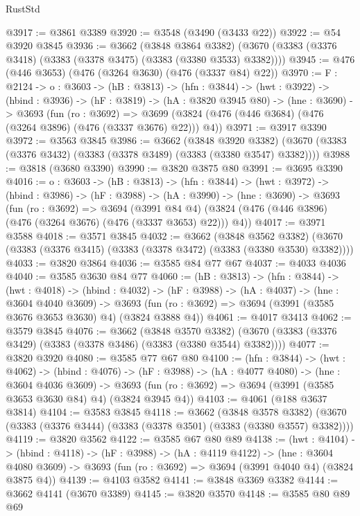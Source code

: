 \begin{lexlean}{RustStd}
\begin{coremodule}
@3917 := @3861 @3389
@3920 := @3548 (@3490 (@3433 @22))
@3922 := @54 @3920 @3845
@3936 := @3662
    (@3848 @3864 @3382)
    (@3670 (@3383 (@3376 @3418) (@3383 (@3378 @3475) (@3383 (@3380 @3533) @3382))))
@3945 := @476 (@446 @3653) (@476 (@3264 @3630) (@476 (@3337 @84) @22))
@3970 := {F : @2124} ->
  {o : @3603} ->
  (hB : @3813) ->
  (hfn : @3844) ->
  (hwt : @3922) ->
  (hbind : @3936) ->
  (hF : @3819) ->
  (hA : @3820 @3945 @80) ->
  (hne : @3690) ->
  @3693
    (fun (ro : @3692) =>
    @3699 (@3824 (@476 (@446 @3684) (@476 (@3264 @3896) (@476 (@3337 @3676) @22))) @4))
@3971 := @3917 @3390
@3972 := @3563 @3845
@3986 := @3662
    (@3848 @3920 @3382)
    (@3670 (@3383 (@3376 @3432) (@3383 (@3378 @3489) (@3383 (@3380 @3547) @3382))))
@3988 := @3818 (@3680 @3390)
@3990 := @3820 @3875 @80
@3991 := @3695 @3390
@4016 := {o : @3603} ->
  (hB : @3813) ->
  (hfn : @3844) ->
  (hwt : @3972) ->
  (hbind : @3986) ->
  (hF : @3988) ->
  (hA : @3990) ->
  (hne : @3690) ->
  @3693
    (fun (ro : @3692) =>
    @3694
      (@3991 @84 @4)
      (@3824 (@476 (@446 @3896) (@476 (@3264 @3676) (@476 (@3337 @3653) @22))) @4))
@4017 := @3971 @3588
@4018 := @3571 @3845
@4032 := @3662
    (@3848 @3562 @3382)
    (@3670 (@3383 (@3376 @3415) (@3383 (@3378 @3472) (@3383 (@3380 @3530) @3382))))
@4033 := @3820 @3864
@4036 := @3585 @84 @77 @67
@4037 := @4033 @4036
@4040 := @3585 @3630 @84 @77
@4060 := (hB : @3813) ->
  (hfn : @3844) ->
  (hwt : @4018) ->
  (hbind : @4032) ->
  (hF : @3988) ->
  (hA : @4037) ->
  (hne : @3604 @4040 @3609) ->
  @3693 (fun (ro : @3692) => @3694 (@3991 (@3585 @3676 @3653 @3630) @4) (@3824 @3888 @4))
@4061 := @4017 @3413
@4062 := @3579 @3845
@4076 := @3662
    (@3848 @3570 @3382)
    (@3670 (@3383 (@3376 @3429) (@3383 (@3378 @3486) (@3383 (@3380 @3544) @3382))))
@4077 := @3820 @3920
@4080 := @3585 @77 @67 @80
@4100 := (hfn : @3844) ->
  (hwt : @4062) ->
  (hbind : @4076) ->
  (hF : @3988) ->
  (hA : @4077 @4080) ->
  (hne : @3604 @4036 @3609) ->
  @3693 (fun (ro : @3692) => @3694 (@3991 (@3585 @3653 @3630 @84) @4) (@3824 @3945 @4))
@4103 := @4061 (@188 @3637 @3814)
@4104 := @3583 @3845
@4118 := @3662
    (@3848 @3578 @3382)
    (@3670 (@3383 (@3376 @3444) (@3383 (@3378 @3501) (@3383 (@3380 @3557) @3382))))
@4119 := @3820 @3562
@4122 := @3585 @67 @80 @89
@4138 := (hwt : @4104) ->
  (hbind : @4118) ->
  (hF : @3988) ->
  (hA : @4119 @4122) ->
  (hne : @3604 @4080 @3609) -> @3693 (fun (ro : @3692) => @3694 (@3991 @4040 @4) (@3824 @3875 @4))
@4139 := @4103 @3582
@4141 := @3848 @3369 @3382
@4144 := @3662 @4141 (@3670 @3389)
@4145 := @3820 @3570
@4148 := @3585 @80 @89 @69

\end{coremodule}
\end{lexlean}
